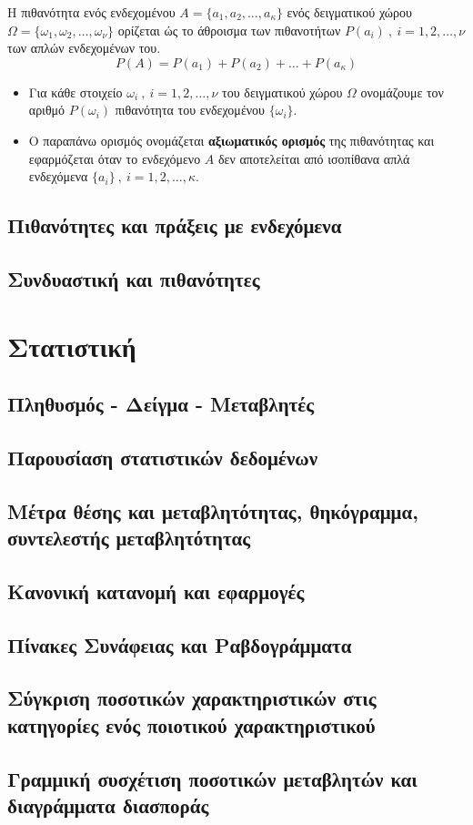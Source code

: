 Η πιθανότητα ενός ενδεχομένου $ A=\{a_1,a_2,\ldots,a_\kappa\} $ ενός δειγματικού χώρου $ \varOmega=\{\omega_1,\omega_2,\ldots,\omega_\nu\} $ ορίζεται ώς το άθροισμα των πιθανοτήτων $ P(a_i)\ ,\ i=1,2,\ldots,\nu $ των απλών ενδεχομένων του.
\[ P(A)=P(a_1)+P(a_2)+\ldots+P(a_\kappa) \]
\begin{itemize}[itemsep=0mm]
\item Για κάθε στοιχείο $ \omega_i\ ,\ i=1,2,\ldots,\nu $ του δειγματικού χώρου $ \varOmega $ ονομάζουμε τον αριθμό $ P(\omega_i) $ πιθανότητα του ενδεχομένου $ \{\omega_i\} $.
\item Ο παραπάνω ορισμός ονομάζεται \textbf{αξιωματικός ορισμός} της πιθανότητας και εφαρμόζεται όταν το ενδεχόμενο $ A $ δεν αποτελείται από ισοπίθανα απλά ενδεχόμενα $ \{a_i\}\ ,\ i=1,2,\ldots,\kappa $.
\end{itemize}

\subsection{Πιθανότητες και πράξεις με ενδεχόμενα}
\subsection{Συνδυαστική και πιθανότητες}
\section{Στατιστική}
\subsection{Πληθυσμός - Δείγμα - Μεταβλητές}
\subsection{Παρουσίαση στατιστικών δεδομένων}
\subsection{Μέτρα θέσης και μεταβλητότητας, θηκόγραμμα, συντελεστής μεταβλητότητας}
\subsection{Κανονική κατανομή και εφαρμογές}
\subsection{Πίνακες Συνάφειας και Ραβδογράμματα}
\subsection{Σύγκριση ποσοτικών χαρακτηριστικών στις κατηγορίες ενός ποιοτικού χαρακτηριστικού}
\subsection{Γραμμική συσχέτιση ποσοτικών μεταβλητών και διαγράμματα διασποράς}
